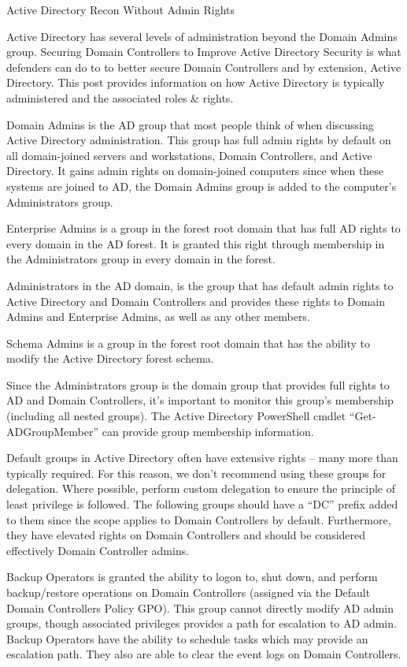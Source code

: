 Active Directory Recon Without Admin Rights

Active Directory has several levels of administration beyond the Domain Admins group. Securing Domain Controllers to Improve Active Directory Security is what defenders can do to to better secure Domain Controllers and by extension, Active Directory. This post provides information on how Active Directory is typically administered and the associated roles \& rights.

Domain Admins is the AD group that most people think of when discussing Active Directory administration. This group has full admin rights by default on all domain-joined servers and workstations, Domain Controllers, and Active Directory. It gains admin rights on domain-joined computers since when these systems are joined to AD, the Domain Admins group is added to the computer’s Administrators group.

Enterprise Admins is a group in the forest root domain that has full AD rights to every domain in the AD forest. It is granted this right through membership in the Administrators group in every domain in the forest.

Administrators in the AD domain, is the group that has default admin rights to Active Directory and Domain Controllers and provides these rights to Domain Admins and Enterprise Admins, as well as any other members.

Schema Admins is a group in the forest root domain that has the ability to modify the Active Directory forest schema.

Since the Administrators group is the domain group that provides full rights to AD and Domain Controllers, it’s important to monitor this group’s membership (including all nested groups). The Active Directory PowerShell cmdlet “Get-ADGroupMember” can provide group membership information.

Default groups in Active Directory often have extensive rights – many more than typically required. For this reason, we don’t recommend using these groups for delegation. Where possible, perform custom delegation to ensure the principle of least privilege is followed. The following groups should have a “DC” prefix added to them since the scope applies to Domain Controllers by default. Furthermore, they have elevated rights on Domain Controllers and should be considered effectively Domain Controller admins.

Backup Operators is granted the ability to logon to, shut down, and perform backup/restore operations on Domain Controllers (assigned via the Default Domain Controllers Policy GPO). This group cannot directly modify AD admin groups, though associated privileges provides a path for escalation to AD admin. Backup Operators have the ability to schedule tasks which may provide an escalation path. They also are able to clear the event logs on Domain Controllers.


